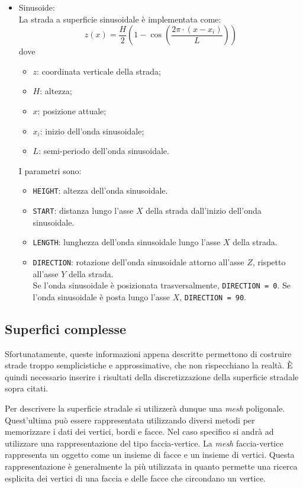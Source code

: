 \begin{itemize}
\begin{pseudoc}
	{ X_road	Z_left	Z_right }
	(XZ_DATA)
	-1.0e04	0	0
	0.0500	0	0
	0.1000	0	0
	0.1500	0	0
	... ... ...
	\end{pseudoc}
	\item Sinusoide:\\
	La strada a superficie sinusoidale è implementata come:
	\begin{equation}
	z(x)=\frac{H}{2}\left( 1 - \cos \left( \frac{2\pi \cdot (x-x_i)}{L} \right)   \right) 
	\end{equation}
	dove	
	\begin{itemize}
	 	\item $z$: coordinata verticale della strada;
	 	\item $H$: altezza;
	 	\item $x$: posizione attuale;
	 	\item $x_i$: inizio dell'onda sinusoidale;
	 	\item $L$: semi-periodo dell'onda sinusoidale.
	\end{itemize}
	I parametri sono:	
	\begin{itemize}
		\item \texttt{HEIGHT}: altezza dell'onda sinusoidale.
		\item \texttt{START}: distanza lungo l'asse $X$ della strada dall'inizio dell'onda sinusoidale.
		\item \texttt{LENGTH}: lunghezza dell'onda sinusoidale lungo l'asse $X$ della strada.
		\item \texttt{DIRECTION}: rotazione dell'onda sinusoidale attorno all'asse $Z$, rispetto all'asse $Y$ della strada.\\
		Se l'onda sinusoidale è posizionata trasversalmente, \texttt{DIRECTION = 0}. Se l'onda sinusoidale è posta lungo l'asse $X$, \texttt{DIRECTION = 90}.
	\end{itemize}
\end{itemize}
%
\subsection{Superfici complesse}
Sfortunatamente, queste informazioni appena descritte permettono di costruire strade troppo semplicistiche e approssimative, che non rispecchiano la realtà. È quindi necessario inserire i risultati della discretizzazione della superficie stradale sopra citati.

Per descrivere la superficie stradale si utilizzerà dunque una \textit{mesh} poligonale. Quest'ultima può essere rappresentata utilizzando diversi metodi per memorizzare i dati dei vertici, bordi e facce. Nel caso specifico si andrà ad utilizzare una rappresentazione del tipo faccia-vertice. La \textit{mesh} faccia-vertice rappresenta un oggetto come un insieme di facce e un insieme di vertici. Questa rappresentazione è generalmente la più utilizzata in quanto permette una ricerca esplicita dei vertici di una faccia e delle facce che circondano un vertice.

